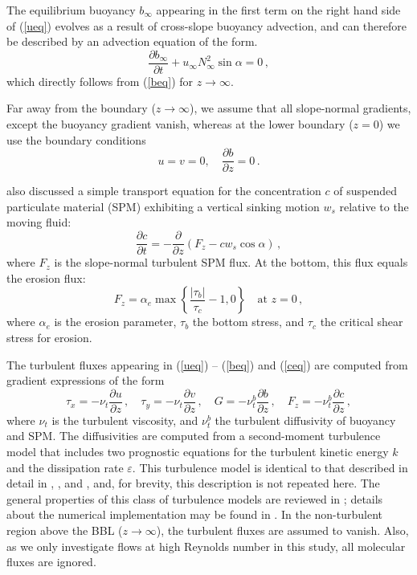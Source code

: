 The equilibrium buoyancy $b_\infty$ appearing in the first term on the
right hand side of (\ref{ueq}) evolves as a result of cross-slope
buoyancy advection, and can therefore be described by an advection
equation of the form.
\begin{equation}
  \label{binf}
  \frac{\partial b_\infty}{\partial t} + u_\infty N_\infty^2 \sin \alpha = 0 \, 
,
\end{equation}
which directly follows from (\ref{beq}) for $z \rightarrow \infty$.

Far away from the boundary ($z\rightarrow \infty$), we assume that all
slope-normal gradients, except the buoyancy gradient vanish, whereas at
the lower boundary ($z = 0$) we use the boundary conditions
\begin{equation}
  \label{uvbBC}
  u=v=0, \quad \frac{\partial b}{\partial z}=0 \, .
\end{equation}

\cite{schulzumlauf2016} also discussed a simple transport equation for
the concentration $c$ of suspended particulate material (SPM)
exhibiting a vertical sinking motion $w_s$ relative to the moving
fluid:
\begin{equation}
  \label{ceq}
  \frac{\partial c}{\partial t} = - \frac{\partial }{\partial z} \left( F_z - c 
w_s  \cos \alpha \right) \, , 
\end{equation}
where $F_z$ is the slope-normal turbulent SPM flux. At the bottom,
this flux equals the erosion flux:
\begin{equation}
  \label{Fzjgr}
  F_z = \alpha_e \max \left\{ \frac{|\tau_b|}{\tau_c} -1,0 \right\} \quad 
\text{at $z=0$} \, ,
\end{equation}
where $\alpha_e$ is the erosion parameter, $\tau_b$ the bottom stress,
and $\tau_c$ the critical shear stress for erosion.

The turbulent fluxes appearing in (\ref{ueq}) -- (\ref{beq}) and
(\ref{ceq}) are computed from gradient expressions of the form
\begin{equation}
  \label{turbfluxes}
  \tau_x = - \nu_t   \frac{\partial u}{\partial z} \, , \quad
  \tau_y = - \nu_t   \frac{\partial v}{\partial z} \, , \quad
  G      = - \nu^b_t \frac{\partial b}{\partial z} \, , \quad
  F_z    = - \nu^b_t \frac{\partial c}{\partial z} \, , 
\end{equation}
where $\nu_t$ is the turbulent viscosity, and $\nu^b_t$ the turbulent
diffusivity of buoyancy and SPM. The diffusivities are computed from a
second-moment turbulence model that includes two prognostic equations
for the turbulent kinetic energy $k$ and the dissipation rate
$\varepsilon$. This turbulence model is identical to that described in
detail in \cite{UmlaufBurchard2011a}, \cite{Umlaufetal2015a}, and
\cite{schulzumlauf2016}, and, for brevity, this description is not
repeated here. The general properties of this class of turbulence
models are reviewed in \cite{UmlaufBurchard2005a}; details about the
numerical implementation may be found in \cite{Umlaufetal2005a}. In
the non-turbulent region above the BBL ($z \rightarrow \infty$), the
turbulent fluxes are assumed to vanish.  Also, as we only investigate
flows at high Reynolds number in this study, all molecular fluxes are
ignored.


